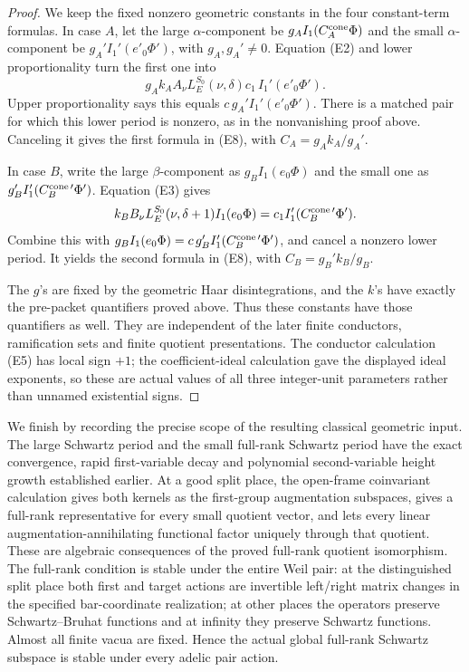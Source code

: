 \begin{proof}
We keep the fixed nonzero geometric constants in the
four constant-term formulas. In case \(A\), let the
large \(\alpha\)-component be \(g_A I_1(C_A^{\rm cone}\Phi)\)
and the small \(\alpha\)-component be
\(g_A'I_1'(e'_0\Phi')\), with \(g_A,g_A'\ne0\).
Equation (E2) and lower proportionality turn the first
one into
\[
   g_A k_A A_\nu L_E^{S_0}(\nu,\delta)c_1\,
                                  I_1'(e'_0\Phi').
\]
Upper proportionality says this equals
\(c\,g_A'I_1'(e'_0\Phi')\).
There is a matched pair for which this lower period is nonzero,
as in the nonvanishing proof above. Canceling it gives
the first formula in (E8), with \(C_A=g_Ak_A/g_A'\).

In case \(B\), write the large \(\beta\)-component as
\(g_B I_1(e_0\Phi)\) and the small one as
\(g_B'I_1'(C_B^{{\rm cone}\,\prime}\Phi')\).
Equation (E3) gives
\[
 k_B B_\nu L_E^{S_0}(\nu,\delta+1)
       I_1(e_0\Phi)
             =c_1 I_1'(C_B^{{\rm cone}\,\prime}\Phi').
\]
Combine this with
\(g_B I_1(e_0\Phi)=
     c\,g_B'I_1'(C_B^{{\rm cone}\,\prime}\Phi')\),
and cancel a nonzero lower period. It yields the second
formula in (E8), with \(C_B=g_B'k_B/g_B\).

The \(g\)'s are fixed by the geometric Haar disintegrations,
and the \(k\)'s have exactly the pre-packet quantifiers
proved above. Thus these constants have those quantifiers
as well. They are independent of the later finite conductors,
ramification sets and finite quotient presentations.
The conductor calculation (E5) has local sign \(+1\);
the coefficient-ideal calculation gave the displayed
ideal exponents, so these are actual values of all three
integer-unit parameters rather than unnamed existential signs.
\end{proof}

We finish by recording the precise scope of the resulting
classical geometric input. The large Schwartz period and
the small full-rank Schwartz period have the exact convergence,
rapid first-variable decay and polynomial second-variable
height growth established earlier. At a good split place,
the open-frame coinvariant calculation gives both kernels
as the first-group augmentation subspaces, gives a full-rank
representative for every small quotient vector, and lets every
linear augmentation-annihilating functional factor uniquely
through that quotient. These are algebraic consequences of
the proved full-rank quotient isomorphism.
The full-rank condition is stable under the entire Weil pair:
at the distinguished split place both first and target actions
are invertible left/right matrix changes in the specified
bar-coordinate realization; at other places the operators
preserve Schwartz--Bruhat functions and at infinity they
preserve Schwartz functions. Almost all finite vacua are fixed.
Hence the actual global full-rank Schwartz subspace is stable
under every adelic pair action.

